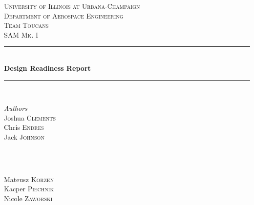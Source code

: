 
\begin{titlepage} %
	\newcommand{\HRule}{\rule{\linewidth}{0.5mm}} %
	
	\center %
	
	
	\textsc{\LARGE University of Illinois at Urbana-Champaign\\ \vspace{10pt}Department of Aerospace Engineering}\\[1.5cm] %
	
	\textsc{\Large Team Toucans}\\[0.5cm] %
	
	\textsc{\large SAM Mk. I}\\[0.5cm] %
	
	
	\HRule\\[0.4cm]
	
	{\huge\bfseries Design Readiness Report}\\[0.4cm] %
	
	\HRule\\[1.5cm]
	
	
	\begin{minipage}{0.4\textwidth}
		\begin{flushleft}
			\large
			\textit{Authors}\\
			Joshua \textsc{Clements}\\
			Chris \textsc{Endres}\\
			Jack \textsc{Johnson}\\
		\end{flushleft}
	\end{minipage}
	~
	\begin{minipage}{0.4\textwidth}
		\begin{flushright}
			\large
			\textit{}\\
			Mateusz \textsc{Korzen}\\
			Kacper \textsc{Piechnik}\\
			Nicole \textsc{Zaworski}
		\end{flushright}
	\end{minipage}
	

\end{titlepage}

